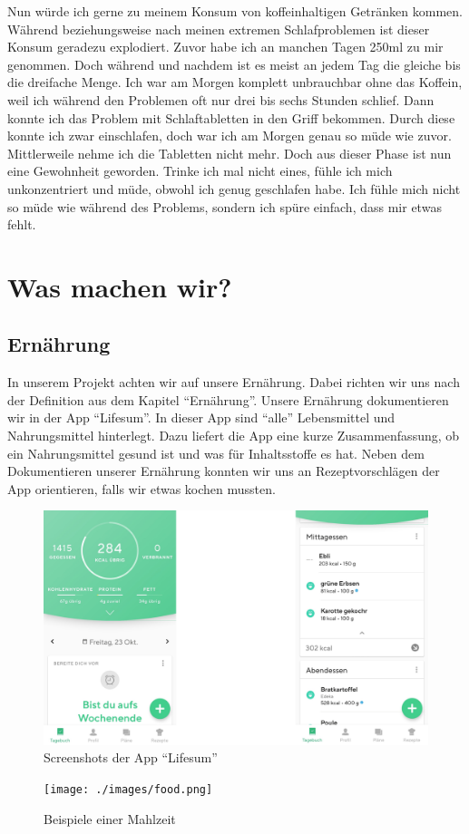 \newline
Nun würde ich gerne zu meinem Konsum von koffeinhaltigen Getränken kommen. Während beziehungsweise nach meinen extremen Schlafproblemen ist dieser Konsum geradezu explodiert. Zuvor habe ich an manchen Tagen 250ml zu mir genommen. Doch während und nachdem ist es meist an jedem Tag die gleiche bis die dreifache Menge. Ich war am Morgen komplett unbrauchbar ohne das Koffein, weil ich während den Problemen oft nur drei bis sechs Stunden schlief. Dann konnte ich das Problem mit Schlaftabletten in den Griff bekommen. Durch diese konnte ich zwar einschlafen, doch war ich am Morgen genau so müde wie zuvor. Mittlerweile nehme ich die Tabletten nicht mehr. Doch aus dieser Phase ist nun eine Gewohnheit geworden. Trinke ich mal nicht eines, fühle ich mich unkonzentriert und müde, obwohl ich genug geschlafen habe. Ich fühle mich nicht so müde wie während des Problems, sondern ich spüre einfach, dass mir etwas fehlt.
\pagebreak
\section{Was machen wir?}
\subsection{Ernährung}
\authortoc{\dario}{\subsectionident}
In unserem Projekt achten wir auf unsere Ernährung. Dabei richten wir uns nach der Definition aus dem Kapitel “Ernährung”.
\newline
Unsere Ernährung dokumentieren wir in der App “Lifesum”. In dieser App sind “alle” Lebensmittel und Nahrungsmittel hinterlegt. Dazu liefert die App eine kurze Zusammenfassung, ob ein Nahrungsmittel gesund ist und was für Inhaltsstoffe es hat. Neben dem Dokumentieren unserer Ernährung konnten wir uns an Rezeptvorschlägen der App orientieren, falls wir etwas kochen mussten.
\newline
\begin{figure}[!ht]
  \centering
  \includegraphics[width=0.7\linewidth]{./images/app.png}
  \caption{Screenshots der App “Lifesum”}
  \label{fig:app_1}
\end{figure}
\newline
\begin{figure}[!ht]
  \centering
  \texttt{[image: ./images/food.png]}
  \caption{Beispiele einer Mahlzeit}
  \label{fig:app_1}
\end{figure}
\newline
